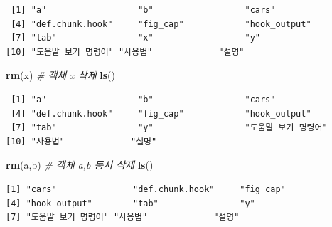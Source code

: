 \documentclass[
  11pt,
]{krantz}
\newenvironment{Shaded}{\begin{snugshade}}{\end{snugshade}}
\newcommand{\CommentTok}[1]{\textcolor[rgb]{0.37,0.37,0.37}{\textit{#1}}}
\newcommand{\DecValTok}[1]{\textcolor[rgb]{0.06,0.06,0.06}{#1}}
\newcommand{\KeywordTok}[1]{\textcolor[rgb]{0.27,0.27,0.27}{\textbf{#1}}}
\newcommand{\NormalTok}[1]{#1}
\newcommand{\OperatorTok}[1]{\textcolor[rgb]{0.43,0.43,0.43}{\textbf{#1}}}
\newcommand{\StringTok}[1]{\textcolor[rgb]{0.5,0.5,0.5}{#1}}
\begin{document}
\normalsize

\footnotesize

\begin{Shaded}
\end{Shaded}

\begin{verbatim}
 [1] "a"                  "b"                  "cars"              
 [4] "def.chunk.hook"     "fig_cap"            "hook_output"       
 [7] "tab"                "x"                  "y"                 
[10] "도움말 보기 명령어" "사용법"             "설명"              
\end{verbatim}

\normalsize

\footnotesize

\begin{Shaded}
\begin{Highlighting}[]
\KeywordTok{rm}\NormalTok{(x) }\CommentTok{# 객체 x 삭제}
\KeywordTok{ls}\NormalTok{()}
\end{Highlighting}
\end{Shaded}

\begin{verbatim}
 [1] "a"                  "b"                  "cars"              
 [4] "def.chunk.hook"     "fig_cap"            "hook_output"       
 [7] "tab"                "y"                  "도움말 보기 명령어"
[10] "사용법"             "설명"              
\end{verbatim}

\begin{Shaded}
\begin{Highlighting}[]
\KeywordTok{rm}\NormalTok{(a,b) }\CommentTok{# 객체 a,b 동시 삭제}
\KeywordTok{ls}\NormalTok{()}
\end{Highlighting}
\end{Shaded}

\begin{verbatim}
[1] "cars"               "def.chunk.hook"     "fig_cap"           
[4] "hook_output"        "tab"                "y"                 
[7] "도움말 보기 명령어" "사용법"             "설명"              
\end{verbatim}
\end{document}
